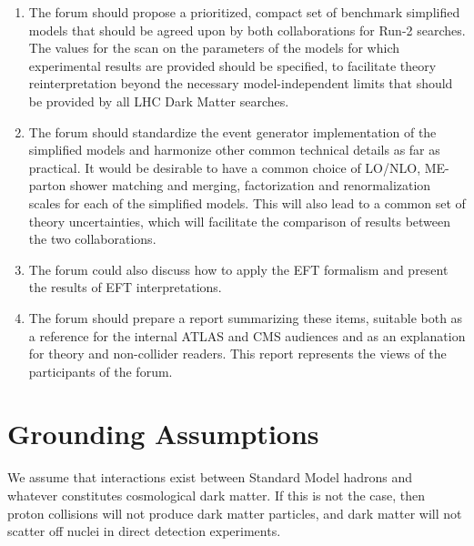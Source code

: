 \begin{enumerate}
\item The forum should propose a prioritized, compact set of benchmark
  simplified models that should be agreed upon by both collaborations for
  Run-2 searches. The values for the scan on the parameters of the models for which
  experimental results are provided should be specified, to facilitate theory reinterpretation 
  beyond the necessary model-independent limits that 
  should be provided by all LHC Dark Matter searches. 
\item The forum should standardize the event generator implementation
  of the simplified models and harmonize other common technical
  details as far as practical. It
  would be desirable to have a common choice of LO/NLO, ME-parton
  shower matching and merging, factorization and renormalization
  scales for each of the simplified models. This will also lead to a
  common set of theory uncertainties, which will facilitate the
  comparison of results between the two collaborations.
\item The forum could also discuss how to apply the
  EFT formalism and present the results of EFT
  interpretations.
\item The forum should prepare a report summarizing these items,
  suitable both as a reference for the internal ATLAS and CMS
  audiences and as an explanation for theory and non-collider
  readers. This report represents the views of the participants of the
  forum.
\end{enumerate}

\section{Grounding Assumptions}

We assume that interactions exist between Standard Model hadrons
and whatever constitutes cosmological dark matter. If this
is not the case, then proton collisions will not produce dark matter
particles, and dark matter will not scatter off nuclei in direct
detection experiments.

